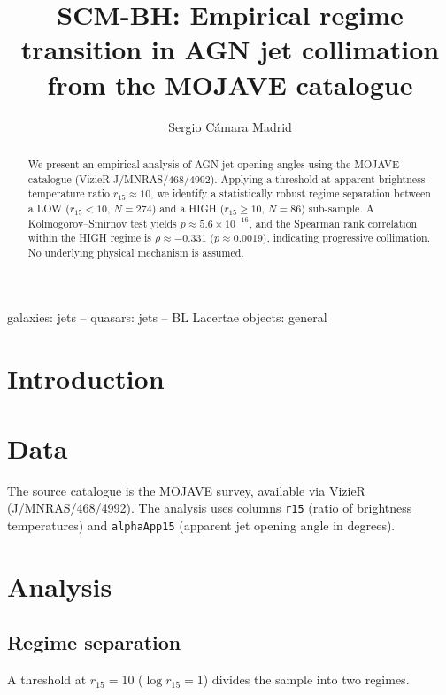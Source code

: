 \documentclass[usenatbib]{mnras}
\title[SCM-BH: Regime transition in AGN jet collimation]{SCM-BH: Empirical regime transition in AGN jet collimation from the MOJAVE catalogue}
\author[S. C\'amara Madrid]{Sergio C\'amara Madrid}
\begin{document}
\maketitle

\begin{abstract}
We present an empirical analysis of AGN jet opening angles using the MOJAVE catalogue
(VizieR J/MNRAS/468/4992). Applying a threshold at apparent brightness-temperature
ratio $r_{15} \approx 10$, we identify a statistically robust regime separation
between a LOW ($r_{15} < 10$, $N = 274$) and a HIGH ($r_{15} \geq 10$, $N = 86$)
sub-sample. A Kolmogorov--Smirnov test yields $p \approx 5.6 \times 10^{-16}$,
and the Spearman rank correlation within the HIGH regime is
$\rho \approx -0.331$ ($p \approx 0.0019$), indicating progressive collimation.
No underlying physical mechanism is assumed.
\end{abstract}

\begin{keywords}
galaxies: jets -- quasars: jets -- BL Lacertae objects: general
\end{keywords}

\section{Introduction}
\label{sec:intro}


\section{Data}
\label{sec:data}

The source catalogue is the MOJAVE survey, available via VizieR (J/MNRAS/468/4992).
The analysis uses columns \texttt{r15} (ratio of brightness temperatures) and
\texttt{alphaApp15} (apparent jet opening angle in degrees).

\section{Analysis}
\label{sec:analysis}

\subsection{Regime separation}

A threshold at $r_{15} = 10$ ($\log r_{15} = 1$) divides the sample into two regimes.
\end{document}
